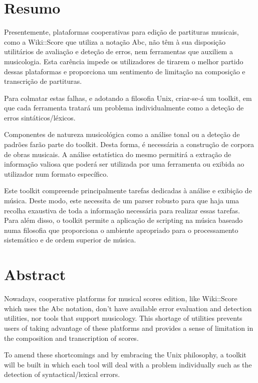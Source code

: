 \documentclass[main.tex]{subfiles}
\begin{document}
\chapter*{Resumo}

Presentemente, plataformas cooperativas para edição de partituras musicais, como a Wiki::Score que
utiliza a notação Abc, não têm à sua disposição utilitários de avaliação e deteção de erros, nem
ferramentas que auxiliem a musicologia. Esta carência impede os utilizadores de tirarem o melhor
partido dessas plataformas e proporciona um sentimento de limitação na composição e transcrição de
partituras.

Para colmatar estas falhas, e adotando a filosofia Unix, criar-se-á um toolkit, em que cada
ferramenta tratará um problema individualmente como a deteção de erros sintáticos/léxicos.

Componentes de natureza musicológica como a análise tonal ou a deteção de
padrões farão parte do toolkit. Desta forma, é necessária a construção de corpora de obras musicais. A análise estatística do mesmo
permitirá a extração de informação valiosa que poderá ser utilizada por uma ferramenta ou exibida ao
utilizador num formato específico.

Este toolkit compreende principalmente tarefas dedicadas à análise e exibição de música. Deste
modo, este necessita de um parser robusto para que haja uma recolha exaustiva de toda a
informação necessária para realizar essas tarefas. Para além disso, o toolkit permite a
aplicação de scripting na música baseado numa filosofia que proporciona o ambiente apropriado para o
processamento sistemático e de ordem superior de música.

\newpage 

\chapter*{Abstract}

Nowadays, cooperative platforms for musical scores edition, like Wiki::Score which uses the Abc
notation, don't have available error evaluation and detection utilities, nor tools that support
musicology. This shortage of utilities prevents users of taking advantage of these platforms and
provides a sense of limitation in the composition and transcription of scores.

To amend these shortcomings and by embracing the Unix philosophy, a toolkit will be built in which
each tool will deal with a problem individually such as the detection of syntactical/lexical
errors. 
\end{document}
